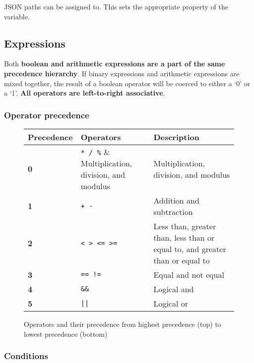 \documentclass[12pt, letterpaper]{article}
\begin{document}
JSON paths can be assigned to. This sets the appropriate property of the variable.

\subsection{Expressions}
\label{sec:expressions}

Both \textbf{boolean and arithmetic expressions are a part of the same precedence hierarchy}. If binary expressions and arithmetic expressions are mixed together, the result of a boolean operator will be coerced to either a `0' or a `1'. \textbf{All operators are left-to-right associative}.

\subsubsection{Operator precedence}

\begin{figure}[H]
    \begin{center}
        \begin{tabular}{| m{2cm} | m{2cm} | m{5cm} |}
            \hline
            Precedence & Operators & Description\\
            \hline
            \textbf{0} & \verb|* / %| & Multiplication, division, and modulus\\
            \hline
            \textbf{1} & \verb|+ -| & Addition and subtraction\\
            \hline
            \textbf{2} & \verb|< > <= >=| & Less than, greater than, less than or equal to, and greater than or equal to\\
            \hline
            \textbf{3} & \verb|== !=| & Equal and not equal\\
            \hline
            \textbf{4} & \verb|&&| & Logical and\\
            \hline
            \textbf{5} & \verb+||+ & Logical or\\
            \hline
        \end{tabular}
    \end{center}
    \caption{Operators and their precedence from highest precedence (top) to lowest precedence (bottom)}
\end{figure}

\subsubsection{Conditions}
\end{document}
